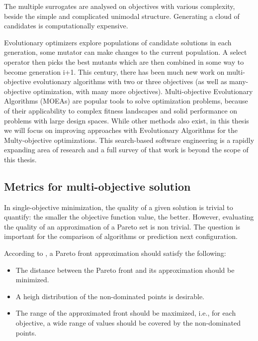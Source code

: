             The multiple surrogates are analysed on objectives with various complexity, beside the simple and complicated unimodal structure. Generating a cloud of candidates is computationally expensive.

            Evolutionary optimizers explore populations of candidate solutions in each generation, some mutator can make changes to the current population. A select operator then picks the best mutants which are then combined in some way to become generation i+1. 
            This century, there has been much new work on multi-objective evolutionary algorithms with two or three objectives 
            (as well as many-objective optimization, with many more objectives). Multi-objective Evolutionary Algorithms (MOEAs) are popular tools to solve optimization problems, because of their applicability to complex fitness landscapes and solid performance on problems with large design spaces. While other methods also exist, in this thesis we will focus on improving approaches with Evolutionary Algorithms for the Multy-objective optimizations.
            This search-based software engineering is a rapidly expanding area of research and a full survey of that work is 
            beyond the scope of this thesis.

        \subsection{Metrics for multi-objective solution}

            In single-objective minimization, the quality of a given solution is trivial to quantify:
            the smaller the objective function value, the better. However, evaluating the quality of an approximation of a Pareto set is non trivial.
            The question is important for the comparison of algorithms or prediction next configuration.

            According to \cite{ZitzlerDT00}, a Pareto front approximation should satisfy the following:
            \begin{itemize}
                \item The distance between the Pareto front and its approximation should be minimized.
                \item A heigh distribution of the non-dominated points is desirable.
                \item The range of the approximated front should be maximized, i.e., for each objective, a wide range of values should be covered by the non-dominated points.
            \end{itemize}

